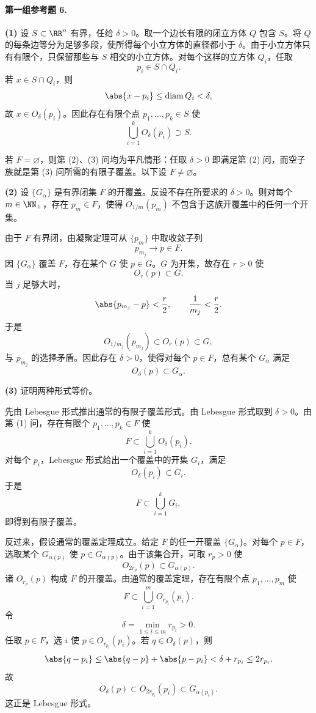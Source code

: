 \paragraph{第一组参考题 6.}
\begin{xsolution}
\textbf{(1)} 设 $S\subset\RR^n$ 有界，任给 $\delta>0$。取一个边长有限的闭立方体 $Q$ 包含 $S$。将 $Q$ 的每条边等分为足够多段，使所得每个小立方体的直径都小于 $\delta$。由于小立方体只有有限个，只保留那些与 $S$ 相交的小立方体。对每个这样的立方体 $Q_i$，任取
\[
  p_i\in S\cap Q_i.
\]
若 $x\in S\cap Q_i$，则
\[
  \abs{x-p_i}\leq\operatorname{diam}Q_i<\delta,
\]
故 $x\in O_\delta(p_i)$。因此存在有限个点 $p_1,\ldots,p_k\in S$ 使
\[
  \bigcup_{i=1}^kO_\delta(p_i)\supset S.
\]

若 $F=\varnothing$，则第 (2)、(3) 问均为平凡情形：任取 $\delta>0$ 即满足第 (2) 问，而空子族就是第 (3) 问所需的有限子覆盖。以下设 $F\neq\varnothing$。

\textbf{(2)} 设 $\{G_\alpha\}$ 是有界闭集 $F$ 的开覆盖。反设不存在所要求的 $\delta>0$。则对每个 $m\in\NN_+$，存在 $p_m\in F$，使得 $O_{1/m}(p_m)$ 不包含于这族开覆盖中的任何一个开集。

由于 $F$ 有界闭，由凝聚定理可从 $\{p_m\}$ 中取收敛子列
\[
  p_{m_j}\to p\in F.
\]
因 $\{G_\alpha\}$ 覆盖 $F$，存在某个 $G$ 使 $p\in G$。$G$ 为开集，故存在 $r>0$ 使
\[
  O_r(p)\subset G.
\]
当 $j$ 足够大时，
\[
  \abs{p_{m_j}-p}<\frac r2,
  \qquad
  \frac1{m_j}<\frac r2.
\]
于是
\[
  O_{1/m_j}(p_{m_j})\subset O_r(p)\subset G,
\]
与 $p_{m_j}$ 的选择矛盾。因此存在 $\delta>0$，使得对每个 $p\in F$，总有某个 $G_\alpha$ 满足
\[
  O_\delta(p)\subset G_\alpha.
\]

\textbf{(3)} 证明两种形式等价。

先由 Lebesgue 形式推出通常的有限子覆盖形式。由 Lebesgue 形式取到 $\delta>0$。由第 (1) 问，存在有限个 $p_1,\ldots,p_k\in F$ 使
\[
  F\subset\bigcup_{i=1}^kO_\delta(p_i).
\]
对每个 $p_i$，Lebesgue 形式给出一个覆盖中的开集 $G_i$，满足
\[
  O_\delta(p_i)\subset G_i.
\]
于是
\[
  F\subset\bigcup_{i=1}^kG_i,
\]
即得到有限子覆盖。

反过来，假设通常的覆盖定理成立。给定 $F$ 的任一开覆盖 $\{G_\alpha\}$。对每个 $p\in F$，选取某个 $G_{\alpha(p)}$ 使 $p\in G_{\alpha(p)}$。由于该集合开，可取 $r_p>0$ 使
\[
  O_{2r_p}(p)\subset G_{\alpha(p)}.
\]
诸 $O_{r_p}(p)$ 构成 $F$ 的开覆盖。由通常的覆盖定理，存在有限个点 $p_1,\ldots,p_m$ 使
\[
  F\subset\bigcup_{i=1}^mO_{r_{p_i}}(p_i).
\]
令
\[
  \delta=\min_{1\leq i\leq m}r_{p_i}>0.
\]
任取 $p\in F$，选 $i$ 使 $p\in O_{r_{p_i}}(p_i)$。若 $q\in O_\delta(p)$，则
\[
  \abs{q-p_i}
  \leq\abs{q-p}+\abs{p-p_i}
  <\delta+r_{p_i}
  \leq2r_{p_i}.
\]
故
\[
  O_\delta(p)\subset O_{2r_{p_i}}(p_i)\subset G_{\alpha(p_i)}.
\]
这正是 Lebesgue 形式。
\end{xsolution}


